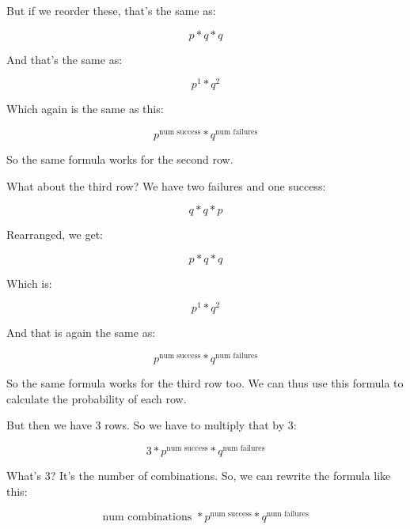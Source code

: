 \documentclass[../../../main.tex]{subfiles}
\begin{document}
But if we reorder these, that's the same as:

\begin{equation*}
   p * q * q
\end{equation*}

And that's the same as:

\begin{equation*}
   p^{1} * q^{2}
\end{equation*}

Which again is the same as this:

\begin{equation*}
   p^{\text{num success}} * q^{\text{num failures}}
\end{equation*}

So the same formula works for the second row.

What about the third row? We have two failures and one success:

\begin{equation*}
    q * q * p
\end{equation*}

Rearranged, we get:

\begin{equation*}
    p * q * q
\end{equation*}

Which is:

\begin{equation*}
   p^{1} * q^{2}
\end{equation*}

And that is again the same as:

\begin{equation*}
   p^{\text{num success}} * q^{\text{num failures}}
\end{equation*}

So the same formula works for the third row too. We can thus use this formula to calculate the probability of each row. 

But then we have 3 rows. So we have to multiply that by 3:

\begin{equation*}
    3 * p^{\text{num success}} * q^{\text{num failures}}
\end{equation*}

What's 3? It's the number of combinations. So, we can rewrite the formula like this:

\begin{equation*}
    \text{num combinations } * p^{\text{num success}} * q^{\text{num failures}}
\end{equation*}
\end{document}
